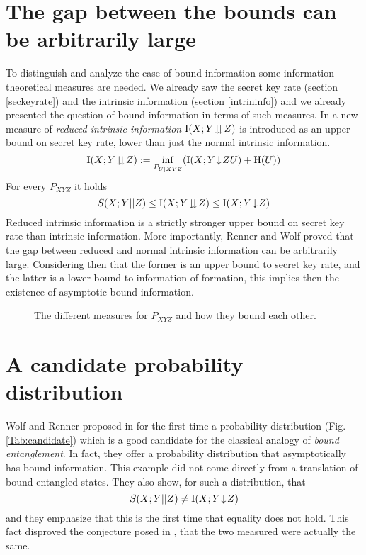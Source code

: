\section{The gap between the bounds can be arbitrarily large}
    To distinguish and analyze the case of bound information some information theoretical measures are needed. 
    We already saw the secret key rate (section \ref{seckeyrate}) and the intrinsic information (section \ref{intrininfo}) and we already presented the question of bound information in terms of such measures. 
    In \cite{RW03} a new measure of \emph{reduced intrinsic information} $\operatorname{I}(X;Y\!\downdownarrows\!Z)$ is introduced as an upper bound on secret key rate, lower than just the normal intrinsic information.
    \begin{equation} \label{eq:reducedintrinfo}
    	\operatorname{I}(X;Y\!\downdownarrows\!Z) := \inf_{P_{U|XYZ}} (\operatorname{I}(X;Y\!\downarrow\!ZU) + \operatorname{H} (U))
    \end{equation}
    For every $P_{XYZ}$ it holds
    \begin{equation} \label{eq:bounds}
    	S(X;Y||Z) \leq \operatorname{I}(X;Y\!\downdownarrows\!Z) \leq \operatorname{I}(X;Y\!\downarrow\!Z)
    \end{equation}
    	Reduced intrinsic information is a strictly stronger upper bound on secret key rate than intrinsic information.
    	More importantly, Renner and Wolf proved that the gap between reduced and normal intrinsic information can be arbitrarily large. 
    	Considering then that the former is an upper bound to secret key rate, and the latter is a lower bound to information of formation, this implies then the existence of asymptotic bound information.
    	\begin{figure}[h!]
    		
    		\caption{The different measures for $P_{XYZ}$ and how they bound each other.}
    	\end{figure}
    	
\section{A candidate probability distribution}\label{daproblem}
    Wolf and Renner proposed in \cite{RW03} for the first time a probability distribution (Fig. \ref{Tab:candidate}) which is a good candidate for the classical analogy of \emph{bound entanglement}. 
    In fact, they offer a probability distribution that asymptotically has bound information. 
    This example did not come directly from a translation of bound entangled states.
    They also show, for such a distribution, that 
    \begin{equation}
    	S(X;Y||Z) \neq \operatorname{I}(X;Y\!\downarrow\!Z)
    \end{equation}  
     and they emphasize that this is the first time that equality does not hold. This fact disproved the conjecture posed in \cite{MW99}, that the two measured were actually the same.
     

